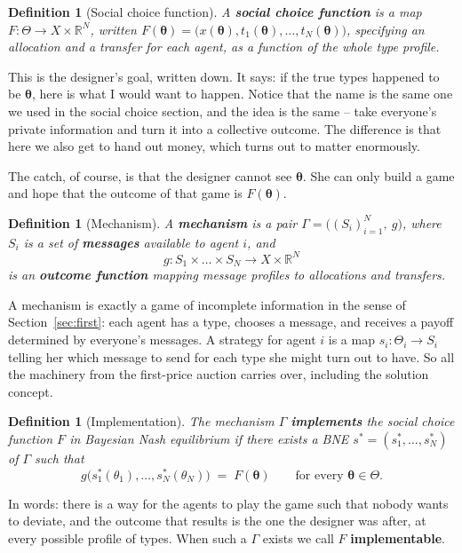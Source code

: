\documentclass[12pt]{article}
\newcommand{\bbR}{\mathbb{R}}
\newtheorem{definition}[theorem]{Definition}
\theoremstyle{definition}
\theoremstyle{remark}
\theoremstyle{plain}                          %
\newcommand{\Th}{\Theta}
\newcommand{\tv}{\boldsymbol{\theta}}
\begin{document}
\begin{definition}[Social choice function]
A \textbf{social choice function} is a map $F : \Th \to X \times \bbR^N$, written $F(\tv) = \big(x(\tv), t_1(\tv),\dots,t_N(\tv)\big)$, specifying an allocation and a transfer for each agent, as a function of the whole type profile.
\end{definition}
 
\noindent This is the designer's goal, written down. It says: if the true types happened to be $\tv$, here is what I would want to happen. Notice that the name is the same one we used in the social choice section, and the idea is the same -- take everyone's private information and turn it into a collective outcome. The difference is that here we also get to hand out money, which turns out to matter enormously.
 
The catch, of course, is that the designer cannot see $\tv$. She can only build a game and hope that the outcome of that game is $F(\tv)$.
 
\begin{definition}[Mechanism]
A \textbf{mechanism} is a pair $\Gamma = \big((S_i)_{i=1}^N,\ g\big)$, where $S_i$ is a set of \textbf{messages} available to agent $i$, and
\[
    g : S_1 \times \dots \times S_N \longrightarrow X \times \bbR^N
\]
is an \textbf{outcome function} mapping message profiles to allocations and transfers.
\end{definition}
 
A mechanism is exactly a game of incomplete information in the sense of Section~\ref{sec:first}: each agent has a type, chooses a message, and receives a payoff determined by everyone's messages. A strategy for agent $i$ is a map $s_i : \Th_i \to S_i$ telling her which message to send for each type she might turn out to have. So all the machinery from the first-price auction carries over, including the solution concept.
 
\begin{definition}[Implementation]\label{def:implement}
The mechanism $\Gamma$ \textbf{implements} the social choice function $F$ in Bayesian Nash equilibrium if there exists a BNE $s^* = (s_1^*,\dots,s_N^*)$ of $\Gamma$ such that
\[
    g\big(s_1^*(\theta_1),\dots,s_N^*(\theta_N)\big) \;=\; F(\tv)
    \qquad \text{for every } \tv \in \Th.
\]
\end{definition}
 
\noindent In words: there is a way for the agents to play the game such that nobody wants to deviate, and the outcome that results is the one the designer was after, at every possible profile of types. When such a $\Gamma$ exists we call $F$ \textbf{implementable}.
 
\end{document}

